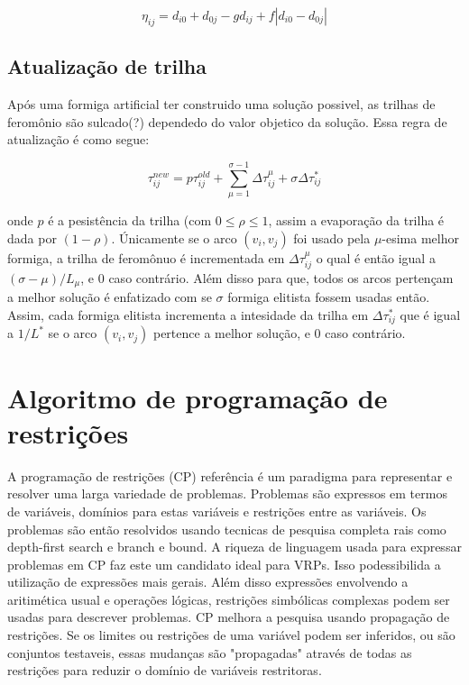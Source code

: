\documentclass[a4paper, 12pt]{article}
\begin{document}
 \[\eta_{ij} = d_{i0}+d_{0j}-gd_{ij}+f|d_{i0}-d_{0j}|\]

\subsection{Atualização de trilha}

 Após uma formiga artificial ter construido uma solução possivel, as trilhas de feromônio são
sulcado(?) dependedo do valor objetico da solução. Essa regra de atualização é como segue:

\[\tau^{new}_{ij} = p \tau^{old}_{ij} + \sum_{\mu=1}^{\sigma-1} \Delta\tau^{\mu}_{ij}+\sigma
\Delta\tau^{*}_{ij}\]

 onde $p$ é a pesistência da trilha (com $0 \leq \rho \leq 1$, assim a evaporação da trilha é dada
por $(1-\rho)$. Únicamente se o arco $(v_i, v_j)$ foi usado pela $\mu$-esima melhor formiga, a
trilha de feromônuo é incrementada em $\Delta \tau_{ij}^\mu$ o qual é então igual a $(\sigma -
\mu)/L_\mu$, e $0$ caso contrário. Além disso para que, todos os arcos pertençam a melhor solução
é enfatizado com se $\sigma$ formiga elitista fossem usadas então. Assim, cada formiga elitista
incrementa a intesidade da trilha em $\Delta \tau_{ij}^*$ que é igual a $1/L^*$ se o arco $(v_i,
v_j)$ pertence a melhor solução, e $0$ caso contrário.


\section{Algoritmo de programação de restrições}

 A programação de restrições (CP) {\color{red} referência} é um paradigma para representar e
resolver uma larga variedade de problemas. Problemas são expressos em termos de variáveis, domínios
para estas variáveis e restrições entre as variáveis. Os problemas são então resolvidos usando
tecnicas de pesquisa completa rais como depth-first search e branch e bound. A riqueza de linguagem
usada para expressar problemas em CP faz este um candidato ideal para VRPs. Isso podessibilida a
utilização de expressões mais gerais. Além disso expressões envolvendo a aritimética usual e
operações lógicas, restrições simbólicas complexas podem ser usadas para descrever problemas. CP
melhora a pesquisa usando propagação de restrições. Se os limites ou restrições de uma variável
podem ser inferidos, ou são conjuntos testaveis, essas mudanças são "propagadas" através de todas as
restrições para reduzir o domínio de variáveis restritoras.
\end{document}
